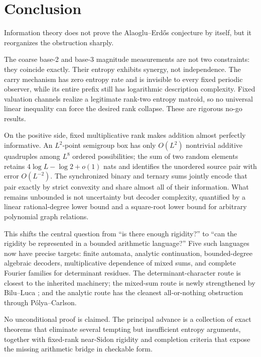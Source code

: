 \documentclass[11pt,oneside]{article}
\theoremstyle{definition}
\theoremstyle{remark}
\begin{document}
\section{Conclusion}\label{sec:conclusion}

Information theory does not prove the Alaoglu--Erd\H{o}s conjecture by itself, but it reorganizes the obstruction sharply.

The coarse base-2 and base-3 magnitude measurements are not two constraints: they coincide exactly.  Their entropy exhibits synergy, not independence.  The carry mechanism has zero entropy rate and is invisible to every fixed periodic observer, while its entire prefix still has logarithmic description complexity.  Fixed valuation channels realize a legitimate rank-two entropy matroid, so no universal linear inequality can force the desired rank collapse.  These are rigorous no-go results.

On the positive side, fixed multiplicative rank makes addition almost perfectly informative.  An \(L^2\)-point semigroup box has only \(O(L^2)\) nontrivial additive quadruples among \(L^8\) ordered possibilities; the sum of two random elements retains \(4\log L-\log2+o(1)\) nats and identifies the unordered source pair with error \(O(L^{-2})\).  The synchronized binary and ternary sums jointly encode that pair exactly by strict convexity and share almost all of their information.  What remains unbounded is not uncertainty but decoder complexity, quantified by a linear rational-degree lower bound and a square-root lower bound for arbitrary polynomial graph relations.

This shifts the central question from ``is there enough rigidity?'' to ``can the rigidity be represented in a bounded arithmetic language?''  Five such languages now have precise targets: finite automata, analytic continuation, bounded-degree algebraic decoders, multiplicative dependence of mixed sums, and complete Fourier families for determinant residues.  The determinant-character route is closest to the inherited machinery; the mixed-sum route is newly strengthened by Bilu--Luca \cite{BiluLuca2026}; and the analytic route has the cleanest all-or-nothing obstruction through P\'olya--Carlson.

No unconditional proof is claimed.  The principal advance is a collection of exact theorems that eliminate several tempting but insufficient entropy arguments, together with fixed-rank near-Sidon rigidity and completion criteria that expose the missing arithmetic bridge in checkable form.
\end{document}
